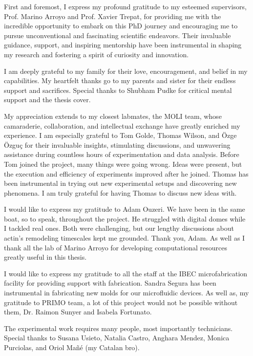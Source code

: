 \begin{Acknowledgements}
	First and foremost, I express my profound gratitude to my esteemed supervisors, Prof. Marino Arroyo and Prof. Xavier Trepat, for providing me with the incredible opportunity to embark on this PhD journey and encouraging me to pursue unconventional and fascinating scientific endeavors. Their invaluable guidance, support, and inspiring mentorship have been instrumental in shaping my research and fostering a spirit of curiosity and innovation.
	
	I am deeply grateful to my family for their love, encouragement, and belief in my capabilities. My heartfelt thanks go to my parents and sister for their endless support and sacrifices. Special thanks to Shubham Pudke for critical mental support and the thesis cover.
	
	My appreciation extends to my closest labmates, the MOLI team, whose camaraderie, collaboration, and intellectual exchange have greatly enriched my experience. I am especially grateful to Tom Golde, Thomas Wilson, and Özge Özguç for their invaluable insights, stimulating discussions, and unwavering assistance during countless hours of experimentation and data analysis. Before Tom joined the project, many things were going wrong. Ideas were present, but the execution and efficiency of experiments improved after he joined. Thomas has been instrumental in trying out new experimental setups and discovering new phenomena. I am truly grateful for having Thomas to discuss new ideas with.
	
	I would like to express my gratitude to Adam Ouzeri. We have been in the same boat, so to speak, throughout the project. He struggled with digital domes while I tackled real ones. Both were challenging, but our lengthy discussions about actin's remodeling timescales kept me grounded. Thank you, Adam. As well as I thank all the lab of Marino Arroyo for developing  computational resources greatly useful in this thesis.
	
	I would like to express my gratitude to all the staff at the IBEC microfabrication facility for providing support with fabrication. Sandra Segura has been instrumental in fabricating new molds for our microfluidic devices. As well as, my gratitude to PRIMO team, a lot of this project would not be possible without them, Dr. Raimon Sunyer and Isabela Fortunato.
	
	The experimental work requires many people, most importantly technicians. Special thanks to Susana Usieto, Natalia Castro, Anghara Mendez, Monica Purciolas, and Oriol Mañé (my Catalan bro).
	

\end{Acknowledgements}
